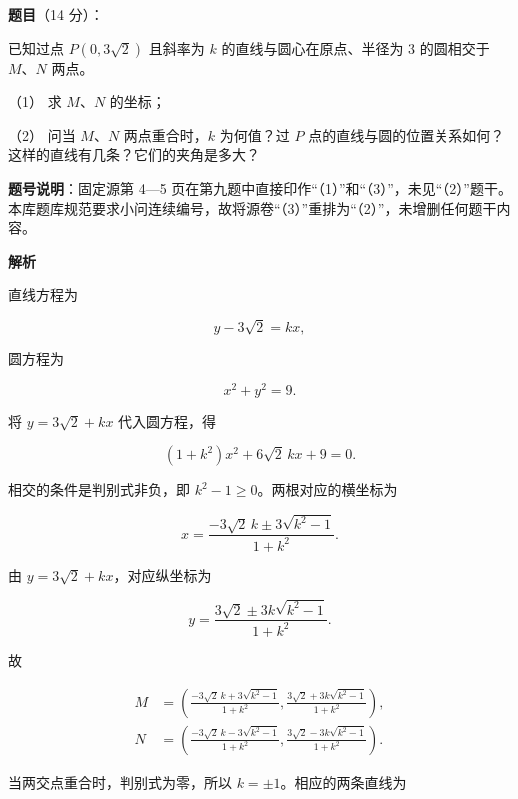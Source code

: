 \begin{answer}

\textbf{题目}（14 分）：

已知过点 $P(0,3\sqrt2)$ 且斜率为 $k$ 的直线与圆心在原点、半径为 $3$ 的圆相交于 $M\text{、}N$ 两点。

（1） 求 $M\text{、}N$ 的坐标；

（2） 问当 $M\text{、}N$ 两点重合时，$k$ 为何值？过 $P$ 点的直线与圆的位置关系如何？这样的直线有几条？它们的夹角是多大？

\begin{gktip}
\textbf{题号说明}：固定源第 4—5 页在第九题中直接印作“（1）”和“（3）”，未见“（2）”题干。本库题库规范要求小问连续编号，故将源卷“（3）”重排为“（2）”，未增删任何题干内容。
\end{gktip}

\textbf{解析}


直线方程为

\nopagebreak[4]
\[
y-3\sqrt2=kx,
\]

圆方程为

\nopagebreak[4]
\[
x^2+y^2=9.
\]

将 $y=3\sqrt2+kx$ 代入圆方程，得

\nopagebreak[4]
\[
(1+k^2)x^2+6\sqrt2\,kx+9=0.
\]

相交的条件是判别式非负，即 $k^2-1\ge0$。两根对应的横坐标为

\nopagebreak[4]
\[
x=\frac{-3\sqrt2\,k\pm3\sqrt{k^2-1}}{1+k^2}.
\]

由 $y=3\sqrt2+kx$，对应纵坐标为

\nopagebreak[4]
\[
y=\frac{3\sqrt2\pm3k\sqrt{k^2-1}}{1+k^2}.
\]

故

\nopagebreak[4]
\[
\begin{aligned}
M&=\left(
\frac{-3\sqrt2\,k+3\sqrt{k^2-1}}{1+k^2},
\frac{3\sqrt2+3k\sqrt{k^2-1}}{1+k^2}
\right),\\
N&=\left(
\frac{-3\sqrt2\,k-3\sqrt{k^2-1}}{1+k^2},
\frac{3\sqrt2-3k\sqrt{k^2-1}}{1+k^2}
\right).
\end{aligned}
\]


当两交点重合时，判别式为零，所以 $k=\pm1$。相应的两条直线为


\end{answer}
